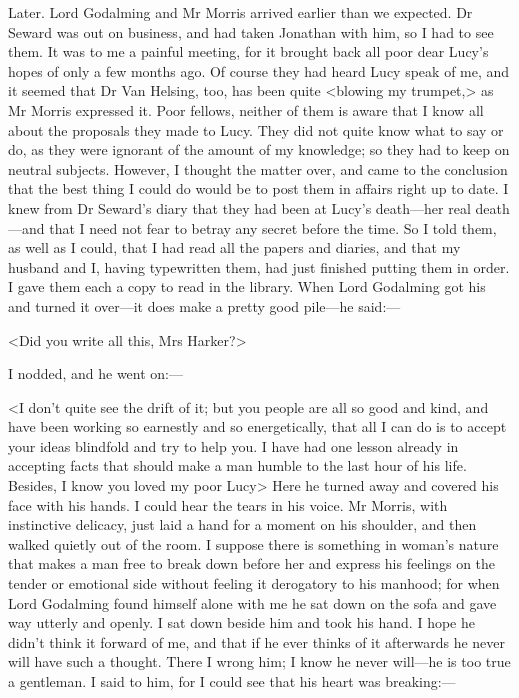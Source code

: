 \begin{diary}{Later.}
Lord Godalming and Mr Morris arrived earlier than we expected. Dr Seward was out on business, and had taken Jonathan with him, so I had to see them. It was to me a painful meeting, for it brought back all poor dear Lucy's hopes of only a few months ago. Of course they had heard Lucy speak of me, and it seemed that Dr Van Helsing, too, has been quite <blowing my trumpet,> as Mr Morris expressed it. Poor fellows, neither of them is aware that I know all about the proposals they made to Lucy. They did not quite know what to say or do, as they were ignorant of the amount of my knowledge; so they had to keep on neutral subjects. However, I thought the matter over, and came to the conclusion that the best thing I could do would be to post them in affairs right up to date. I knew from Dr Seward's diary that they had been at Lucy's death—her real death—and that I need not fear to betray any secret before the time. So I told them, as well as I could, that I had read all the papers and diaries, and that my husband and I, having typewritten them, had just finished putting them in order. I gave them each a copy to read in the library. When Lord Godalming got his and turned it over—it does make a pretty good pile—he said:—

<Did you write all this, Mrs Harker?>

I nodded, and he went on:—

<I don't quite see the drift of it; but you people are all so good and kind, and have been working so earnestly and so energetically, that all I can do is to accept your ideas blindfold and try to help you. I have had one lesson already in accepting facts that should make a man humble to the last hour of his life. Besides, I know you loved my poor Lucy\longdash> Here he turned away and covered his face with his hands. I could hear the tears in his voice. Mr Morris, with instinctive delicacy, just laid a hand for a moment on his shoulder, and then walked quietly out of the room. I suppose there is something in woman's nature that makes a man free to break down before her and express his feelings on the tender or emotional side without feeling it derogatory to his manhood; for when Lord Godalming found himself alone with me he sat down on the sofa and gave way utterly and openly. I sat down beside him and took his hand. I hope he didn't think it forward of me, and that if he ever thinks of it afterwards he never will have such a thought. There I wrong him; I know he never will—he is too true a gentleman. I said to him, for I could see that his heart was breaking:—


\end{diary}
